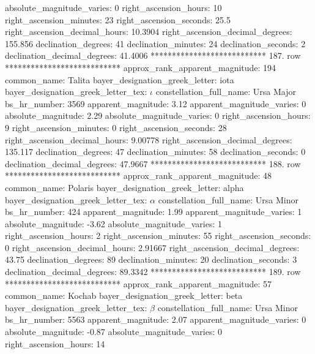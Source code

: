          absolute_magnitude_varies: 0
             right_ascension_hours: 10
           right_ascension_minutes: 23
           right_ascension_seconds: 25.5
     right_ascension_decimal_hours: 10.3904
   right_ascension_decimal_degrees: 155.856
               declination_degrees: 41
               declination_minutes: 24
               declination_seconds: 2
       declination_decimal_degrees: 41.4006
*************************** 187. row ***************************
    approx_rank_apparent_magnitude: 194
                       common_name: Talita
    bayer_designation_greek_letter: iota
bayer_designation_greek_letter_tex: $\iota$
           constellation_full_name: Ursa Major
                      bs_hr_number: 3569
                apparent_magnitude: 3.12
         apparent_magnitude_varies: 0
                absolute_magnitude: 2.29
         absolute_magnitude_varies: 0
             right_ascension_hours: 9
           right_ascension_minutes: 0
           right_ascension_seconds: 28
     right_ascension_decimal_hours: 9.00778
   right_ascension_decimal_degrees: 135.117
               declination_degrees: 47
               declination_minutes: 58
               declination_seconds: 0
       declination_decimal_degrees: 47.9667
*************************** 188. row ***************************
    approx_rank_apparent_magnitude: 48
                       common_name: Polaris
    bayer_designation_greek_letter: alpha
bayer_designation_greek_letter_tex: $\alpha$
           constellation_full_name: Ursa Minor
                      bs_hr_number: 424
                apparent_magnitude: 1.99
         apparent_magnitude_varies: 1
                absolute_magnitude: -3.62
         absolute_magnitude_varies: 1
             right_ascension_hours: 2
           right_ascension_minutes: 55
           right_ascension_seconds: 0
     right_ascension_decimal_hours: 2.91667
   right_ascension_decimal_degrees: 43.75
               declination_degrees: 89
               declination_minutes: 20
               declination_seconds: 3
       declination_decimal_degrees: 89.3342
*************************** 189. row ***************************
    approx_rank_apparent_magnitude: 57
                       common_name: Kochab
    bayer_designation_greek_letter: beta
bayer_designation_greek_letter_tex: $\beta$
           constellation_full_name: Ursa Minor
                      bs_hr_number: 5563
                apparent_magnitude: 2.07
         apparent_magnitude_varies: 0
                absolute_magnitude: -0.87
         absolute_magnitude_varies: 0
             right_ascension_hours: 14
